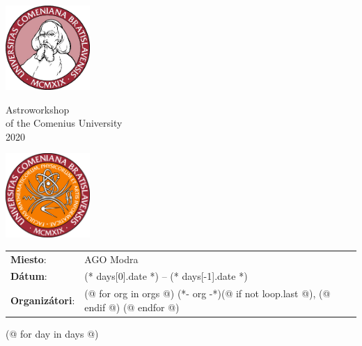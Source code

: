 \documentclass[a4paper]{report}
\begin{document}
    \begin{minipage}{\textwidth}
        \begin{minipage}{0.2\textwidth}
            \includegraphics[width=32mm]{input/logo.jpg}
        \end{minipage}
        \begin{minipage}{0.58\textwidth}
            \centering
            \fontsize{40}{50}\selectfont
            Astroworkshop\\
            \large
            of the Comenius University\\
            2020
        \end{minipage}
        \begin{minipage}{0.2\textwidth}
            \includegraphics[width=32mm]{input/fmfi.png}
        \end{minipage}
    \end{minipage}
    \vspace*{10mm}

    \begin{tabularx}{\textwidth}{>{}p{2cm} >{\RaggedRight}X}
        \textbf{Miesto}:    & AGO Modra \\
        \textbf{Dátum}:     & (* days[0].date *) -- (* days[-1].date *) \\
        \textbf{Organizátori}: &
            (@ for org in orgs @)
                (*- org -*)(@ if not loop.last @), (@ endif @)
            (@ endfor @) \\
    \end{tabularx}

    (@ for day in days @)
        \section{\color[rgb]{0, 0.1, 0.4}{(* day.title *)}}
\end{document}

